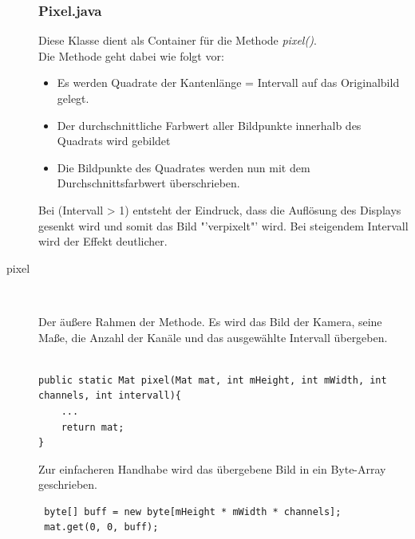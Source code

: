 \begin{description}
\subsubsection{Pixel.java}
\label{Pixel}
Diese Klasse dient als Container für die Methode \textit{pixel()}.\\
Die Methode geht dabei wie folgt vor:
\begin{itemize}
\item Es werden Quadrate der Kantenlänge = Intervall auf das Originalbild gelegt.
\item Der durchschnittliche Farbwert aller Bildpunkte innerhalb des Quadrats wird gebildet
\item Die Bildpunkte des Quadrates werden nun mit dem Durchschnittsfarbwert überschrieben.
\end{itemize}
Bei (Intervall > 1) entsteht der Eindruck, dass die Auflösung des Displays gesenkt wird und somit das Bild "'verpixelt"' wird. Bei steigendem Intervall wird der Effekt deutlicher. \\

\item[pixel]~\par
\label{pixel}
Der äußere Rahmen der Methode. Es wird das Bild der Kamera, seine Maße, die Anzahl der Kanäle und das ausgewählte Intervall übergeben.
\\\
\begin{lstlisting}
public static Mat pixel(Mat mat, int mHeight, int mWidth, int channels, int intervall){ 
	...
	return mat;
} 
\end{lstlisting}

Zur einfacheren Handhabe wird das übergebene Bild in ein Byte-Array geschrieben.
\begin{lstlisting}
 byte[] buff = new byte[mHeight * mWidth * channels];
 mat.get(0, 0, buff);
\end{lstlisting}


\end{description}
